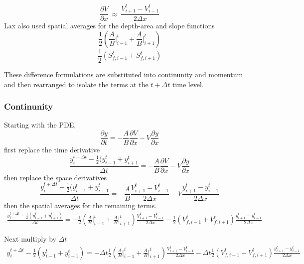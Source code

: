 \begin{equation}
\frac{\partial V}{\partial x}~\approx~\frac{V_{i+1}^{t}-V_{i-1}^t}{2\Delta x}
\end{equation}
Lax also used spatial averages for the depth-area and slope functions
\begin{equation}
\frac{1}{2}(\frac{A}{B}\vert_{i-1}^t + \frac{A}{B}\vert_{i+1}^t)
\end{equation}
\begin{equation}
\frac{1}{2}(S_{f,i-1}^t + S_{f,i+1}^t)
\end{equation}

These difference formulations are substituted into continunity and momentum and then rearranged to isolate the terms at the $t+\Delta t$ time level.

\subsubsection{Continunity}
Starting with the PDE,
\begin{equation}
\frac{\partial y}{\partial t} = -\frac{A}{B}\frac{\partial V}{\partial x}-V\frac{\partial y}{\partial x}
\end{equation}
first replace the time derivative
\begin{equation}
\frac{y_i^{t+\Delta t}-\frac{1}{2}(y_{i-1}^t+y_{i+1}^t}{\Delta t} = -\frac{A}{B}\frac{\partial V}{\partial x}-V\frac{\partial y}{\partial x}
\end{equation}
then replace the space derivatives
\begin{equation}
\frac{y_i^{t+\Delta t}-\frac{1}{2}(y_{i-1}^t+y_{i+1}^t}{\Delta t} = -\frac{A}{B}\frac{V_{i+1}^{t}-V_{i-1}^t}{2\Delta x}-V\frac{y_{i+1}^{t}-y_{i-1}^t}{2\Delta x}
\end{equation}
then the spatial averages for the remaining terms.
\begin{equation}
\begin{matrix}
\frac{y_i^{t+\Delta t}-\frac{1}{2}(y_{i-1}^t+y_{i+1}^t)}{\Delta t} = -\frac{1}{2}(\frac{A}{B}\vert_{i-1}^t + \frac{A}{B}\vert_{i+1}^t)\frac{V_{i+1}^{t}-V_{i-1}^t}{2\Delta x}-\frac{1}{2}(V_{f,i-1}^t + V_{f,i+1}^t)\frac{y_{i+1}^{t}-y_{i-1}^t}{2\Delta x}\\
~\\
 \end{matrix}
\end{equation}
Next multiply by $\Delta t$
\begin{equation}
\begin{matrix}
y_i^{t+\Delta t}-\frac{1}{2}(y_{i-1}^t+y_{i+1}^t) = -\Delta t\frac{1}{2}(\frac{A}{B}\vert_{i-1}^t + \frac{A}{B}\vert_{i+1}^t)\frac{V_{i+1}^{t}-V_{i-1}^t}{2\Delta x}-\Delta t \frac{1}{2}(V_{f,i-1}^t + V_{f,i+1}^t)\frac{y_{i+1}^{t}-y_{i-1}^t}{2\Delta x}\\
~\\
 \end{matrix}
\end{equation}
